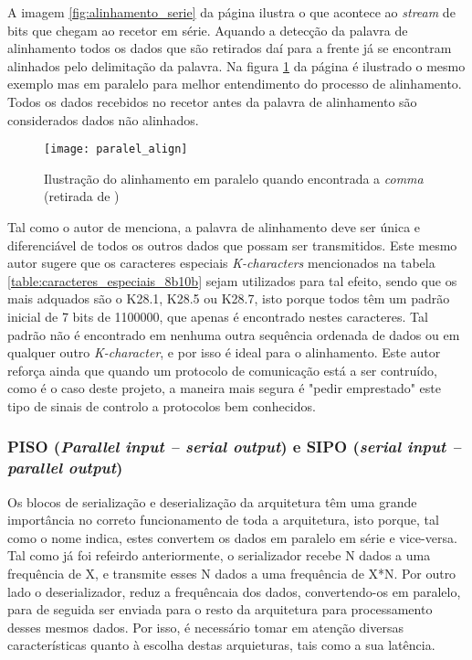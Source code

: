 A imagem \ref{fig:alinhamento_serie} da página \pageref{fig:alinhamento_serie} ilustra o que acontece ao \textit{stream} de bits que chegam ao recetor em série. Aquando a detecção da palavra de alinhamento todos os dados que são retirados daí para a frente já se encontram alinhados pelo delimitação da palavra. Na figura \ref{fig:alinhamento_paralelo} da página \pageref{fig:alinhamento_paralelo} é ilustrado o mesmo exemplo mas em paralelo para melhor entendimento do processo de alinhamento. Todos os dados recebidos no recetor antes da palavra de alinhamento são considerados dados não alinhados.
\begin{figure}[h!]
	\begin{center}
		\leavevmode
		\texttt{[image: paralel\_align]}
		\caption[Ilustração do alinhamento em paralelo quando encontrada a \textit{comma}]{Ilustração do alinhamento em paralelo quando encontrada a \textit{comma} (retirada de \cite{R011})}
		\label{fig:alinhamento_paralelo}
	\end{center}
\end{figure}

Tal como o autor de \cite{R032} menciona, a palavra de alinhamento deve ser única e diferenciável de todos os outros dados que possam ser transmitidos. Este mesmo autor sugere que os caracteres especiais \textit{K-characters} mencionados na tabela \ref{table:caracteres_especiais_8b10b} sejam utilizados para tal efeito, sendo que os mais adquados são o K28.1, K28.5 ou K28.7, isto porque todos têm um padrão inicial de 7 bits de 1100000, que apenas é encontrado nestes caracteres. Tal padrão não é encontrado em nenhuma outra sequência ordenada de dados ou em qualquer outro \textit{K-character}, e por isso é ideal para o alinhamento. Este autor reforça ainda que quando um protocolo de comunicação está a ser contruído, como é o caso deste projeto, a maneira mais segura é "pedir emprestado" este tipo de sinais de controlo a protocolos bem conhecidos.



\subsubsection*{PISO (\textit{Parallel input – serial output}) e SIPO (\textit{serial input – parallel output})}

Os blocos de serialização e deserialização da arquitetura têm uma grande importância no correto funcionamento de toda a arquitetura, isto porque, tal como o nome indica, estes convertem os dados em paralelo em série e vice-versa. Tal como já foi refeirdo anteriormente, o serializador recebe N dados a uma frequência de X, e transmite esses N dados a uma frequência de X*N. Por outro lado o deserializador, reduz a frequêncaia dos dados, convertendo-os em paralelo, para de seguida ser enviada para o resto da arquitetura para processamento desses mesmos dados. Por isso, é necessário tomar em atenção diversas características quanto à escolha destas arquieturas, tais como a sua latência.

